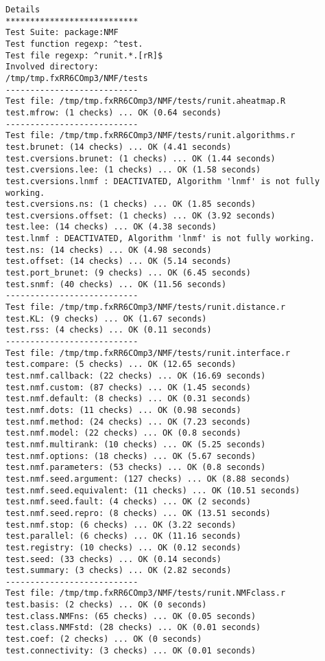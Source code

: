 \documentclass[10pt]{article}
\begin{document}
\begin{verbatim}
Details 
*************************** 
Test Suite: package:NMF 
Test function regexp: ^test. 
Test file regexp: ^runit.*.[rR]$ 
Involved directory: 
/tmp/tmp.fxRR6COmp3/NMF/tests 
--------------------------- 
Test file: /tmp/tmp.fxRR6COmp3/NMF/tests/runit.aheatmap.R 
test.mfrow: (1 checks) ... OK (0.64 seconds)
--------------------------- 
Test file: /tmp/tmp.fxRR6COmp3/NMF/tests/runit.algorithms.r 
test.brunet: (14 checks) ... OK (4.41 seconds)
test.cversions.brunet: (1 checks) ... OK (1.44 seconds)
test.cversions.lee: (1 checks) ... OK (1.58 seconds)
test.cversions.lnmf : DEACTIVATED, Algorithm 'lnmf' is not fully working.
test.cversions.ns: (1 checks) ... OK (1.85 seconds)
test.cversions.offset: (1 checks) ... OK (3.92 seconds)
test.lee: (14 checks) ... OK (4.38 seconds)
test.lnmf : DEACTIVATED, Algorithm 'lnmf' is not fully working.
test.ns: (14 checks) ... OK (4.98 seconds)
test.offset: (14 checks) ... OK (5.14 seconds)
test.port_brunet: (9 checks) ... OK (6.45 seconds)
test.snmf: (40 checks) ... OK (11.56 seconds)
--------------------------- 
Test file: /tmp/tmp.fxRR6COmp3/NMF/tests/runit.distance.r 
test.KL: (9 checks) ... OK (1.67 seconds)
test.rss: (4 checks) ... OK (0.11 seconds)
--------------------------- 
Test file: /tmp/tmp.fxRR6COmp3/NMF/tests/runit.interface.r 
test.compare: (5 checks) ... OK (12.65 seconds)
test.nmf.callback: (22 checks) ... OK (16.69 seconds)
test.nmf.custom: (87 checks) ... OK (1.45 seconds)
test.nmf.default: (8 checks) ... OK (0.31 seconds)
test.nmf.dots: (11 checks) ... OK (0.98 seconds)
test.nmf.method: (24 checks) ... OK (7.23 seconds)
test.nmf.model: (22 checks) ... OK (0.8 seconds)
test.nmf.multirank: (10 checks) ... OK (5.25 seconds)
test.nmf.options: (18 checks) ... OK (5.67 seconds)
test.nmf.parameters: (53 checks) ... OK (0.8 seconds)
test.nmf.seed.argument: (127 checks) ... OK (8.88 seconds)
test.nmf.seed.equivalent: (11 checks) ... OK (10.51 seconds)
test.nmf.seed.fault: (4 checks) ... OK (2 seconds)
test.nmf.seed.repro: (8 checks) ... OK (13.51 seconds)
test.nmf.stop: (6 checks) ... OK (3.22 seconds)
test.parallel: (6 checks) ... OK (11.16 seconds)
test.registry: (10 checks) ... OK (0.12 seconds)
test.seed: (33 checks) ... OK (0.14 seconds)
test.summary: (3 checks) ... OK (2.82 seconds)
--------------------------- 
Test file: /tmp/tmp.fxRR6COmp3/NMF/tests/runit.NMFclass.r 
test.basis: (2 checks) ... OK (0 seconds)
test.class.NMFns: (65 checks) ... OK (0.05 seconds)
test.class.NMFstd: (28 checks) ... OK (0.01 seconds)
test.coef: (2 checks) ... OK (0 seconds)
test.connectivity: (3 checks) ... OK (0.01 seconds)

\end{verbatim}
\end{document}
